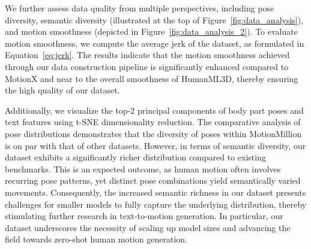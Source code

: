 We further assess data quality from multiple perspectives, including pose diversity, semantic diversity (illustrated at the top of Figure~\ref{fig:data_analysis}), and motion smoothness (depicted in Figure~\ref{fig:data_analysis_2}). To evaluate motion smoothness, we compute the average jerk of the dataset, as formulated in Equation~\ref{eq:jerk}. The results indicate that the motion smoothness achieved through our data construction pipeline is significantly enhanced compared to MotionX and near to the overall smoothness of HumanML3D, thereby ensuring the high quality of our dataset.

Additionally, we visualize the top-2 principal components of body part poses and text features using t-SNE dimensionality reduction. The comparative analysis of pose distributions demonstrates that the diversity of poses within MotionMillion is on par with that of other datasets. However, in terms of semantic diversity, our dataset exhibits a significantly richer distribution compared to existing benchmarks. This is an expected outcome, as human motion often involves recurring pose patterns, yet distinct pose combinations yield semantically varied movements.
Consequently, the increased semantic richness in our dataset presents challenges for smaller models to fully capture the underlying distribution, thereby stimulating further research in text-to-motion generation. In particular, our dataset underscores the necessity of scaling up model sizes and advancing the field towards zero-shot human motion generation.
